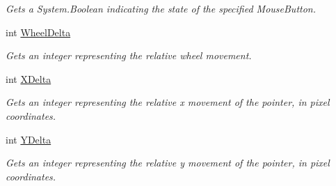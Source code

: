 \begin{DoxyCompactItemize}
\begin{DoxyCompactList}\small\item\em Gets a System.\-Boolean indicating the state of the specified Mouse\-Button. \end{DoxyCompactList}\item 
int \hyperlink{class_open_t_k_1_1_input_1_1_mouse_device_a834230a316172123e7dc9eccdfe9ac5c}{Wheel\-Delta}
\begin{DoxyCompactList}\small\item\em Gets an integer representing the relative wheel movement. \end{DoxyCompactList}\item 
int \hyperlink{class_open_t_k_1_1_input_1_1_mouse_device_a4f6d5b4e04871884c0b20c0b005b5336}{X\-Delta}
\begin{DoxyCompactList}\small\item\em Gets an integer representing the relative x movement of the pointer, in pixel coordinates. \end{DoxyCompactList}\item 
int \hyperlink{class_open_t_k_1_1_input_1_1_mouse_device_ab1689cd29ee92df3c5ca955b166636e4}{Y\-Delta}
\begin{DoxyCompactList}\small\item\em Gets an integer representing the relative y movement of the pointer, in pixel coordinates. \end{DoxyCompactList}\end{DoxyCompactItemize}
